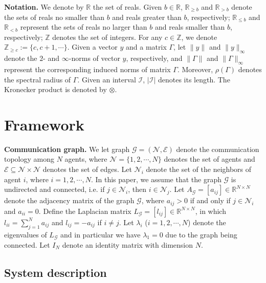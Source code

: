 \documentclass[letterpaper,journal,final,twocolumn]{IEEEtran}
\begin{document}
\textbf{Notation.} We denote by  $\mathbb R$ the set of reals. Given $b \in \mathbb R$, $\mathbb R_{\geq b}$ and $\mathbb R_{>b}$ denote the sets of reals no smaller than $b$ and reals greater than $b$, respectively; $\mathbb R_{\le b}$ and $\mathbb R_{<b}$ represent the sets of reals no larger than $b$ and reals smaller than $b$, respectively; $\mathbb Z$ denotes the set of integers. For any $c \in \mathbb Z$, we denote $\mathbb Z_{\ge c} := \{c,c+ 1,\cdots\}$. 
Given a vector $y$ and a matrix $\Gamma$, let $\|y\|$ and $\|y\|_\infty$ denote the $2 $- and $\infty$-norms of vector $y$, respectively,  
and $\|\Gamma\|$ and $\|\Gamma\|_\infty$ represent the corresponding induced norms of matrix $\Gamma$. Moreover, $\rho(\Gamma)$ denotes the spectral radius of $\Gamma$. Given an interval $\mathcal{I}$, $|\mathcal{I}|$ denotes its length. The Kronecker product is denoted by $\otimes$. 





\section{Framework}
\textbf{Communication graph.}
We let graph $\mathcal{G} = (\mathcal{N},\mathcal{E})$ denote the communication topology among $N$  agents, where $\mathcal{N}=\{1, 2, \cdots, N \}$ denotes the set of agents and $\mathcal{E} \subseteq \mathcal{N} \times \mathcal{N}$ denotes the set of edges. Let $\mathcal N_i$ denote the set of the neighbors of agent $i$, where $i=1, 2, \cdots, N$. In this paper, we assume that the graph $\mathcal{G}$ is undirected and connected, i.e. if $j \in \mathcal N_i$, then $i \in \mathcal N_j$. Let $A _ {\mathcal G}= [a_{ij}] \in \mathbb{R}^{N\times N} $ denote the adjacency matrix of the graph $\mathcal {G}$, where $a_{ij} > 0$ if and only if $j \in \mathcal N_i$ and $a_{ii}=0$. Define the Laplacian matrix $L_ \mathcal{G} = [l_{ij}]  \in \mathbb{R}^{N\times N} $, in which $l_{ii} = \sum_{j = 1 }^{N} a_{ij}$ and $l_{ij} = - a_{ij} $ if $i \ne j $. Let $\lambda_i$ ($i=1, 2, \cdots, N$) denote the eigenvalues of $L_ \mathcal{G}$ and in particular we have $\lambda_1 = 0$ due to the graph being connected. Let $I_N$ denote an identity matrix with dimension $N$.  



\subsection{System description}
\end{document}
